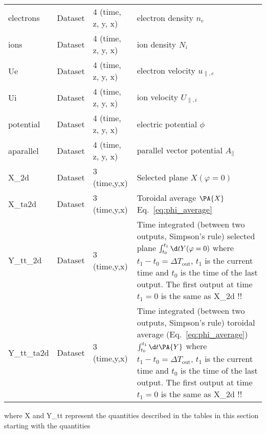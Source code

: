 \begin{longtable}{lll>{\RaggedRight}p{7cm}}
electrons        & Dataset & 4 (time, z, y, x) & electron density $n_e$ \\
ions             & Dataset & 4 (time, z, y, x) & ion density $N_i$ \\
Ue               & Dataset & 4 (time, z, y, x) & electron velocity $u_{\parallel,e}$ \\
Ui               & Dataset & 4 (time, z, y, x) & ion velocity $U_{\parallel,i}$ \\
potential        & Dataset & 4 (time, z, y, x) & electric potential $\phi$ \\
aparallel        & Dataset & 4 (time, z, y, x) & parallel vector potential $A_\parallel$ \\
X\_2d            & Dataset & 3 (time,y,x) & Selected plane $X(\varphi=0)$ \\
X\_ta2d          & Dataset & 3 (time,y,x) & Toroidal average $\PA{ X }$
Eq.~\eqref{eq:phi_average} \\
Y\_tt\_2d        & Dataset & 3 (time,y,x) & Time integrated (between two outputs, Simpson's rule) selected plane
$\int_{t_0}^{t_1}\d t Y(\varphi=0) $
where $t_1 - t_0 = \Delta T_{\text{out}}$, $t_1$ is the current time and $t_0$ is the time of the last output. \color{red} The first output at time $t_1=0$ is the same as X\_2d !!\color{black} \\
Y\_tt\_ta2d      & Dataset & 3 (time,y,x) & Time integrated (between two outputs, Simpson's rule) toroidal average (Eq.~\eqref{eq:phi_average})
$\int_{t_0}^{t_1}\d t \PA{ Y }$
where $t_1 - t_0 = \Delta T_{\text{out}}$, $t_1$ is the current time and $t_0$ is the time of the last output. \color{red} The first output at time $t_1 = 0$ is the same as X\_2d !!\color{black} \\
\bottomrule
\end{longtable}
where
X and Y\_tt represent the quantities described in the tables in this section starting with the quantities
